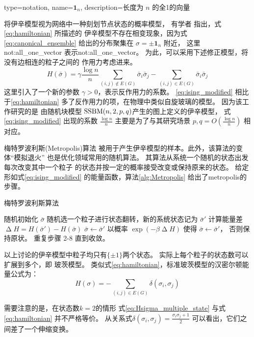 {
  type=notation,
  name={\ensuremath{\mathbf{1}_n}},
  description={长度为 $n$ 的全1的向量}
}

将伊辛模型视为网络中一种刻划节点状态的概率模型，
有学者\cite{ye2020exact}
指出，式\eqref{eq:hamiltonian} 所描述的
伊辛模型不存在相变现象，因为式\eqref{eq:canonical_ensemble}
给出的分布聚集在 $\sigma=\pm \mathbf{1}_n$ 附近，
这里 \gls{not:all_one_vector} 表示\glsdesc{not:all_one_vector}。
为此，可以采用下述修正模型，将没有边相连的粒子之间的
作用力考虑进来。
\begin{equation}\label{eq:ising_modified}
  H(\bar{\sigma}) = \gamma \frac{\log n}{n} \sum_{(i,j)\not\in E(G)}
  \bar{\sigma}_i  \bar{\sigma}_j
	- \sum_{(i,j)\in E(G)}
  \bar{\sigma}_i  \bar{\sigma}_j
\end{equation}
这里引入了一个新的参数 $\gamma > 0$，表示反作用力的系数。
\eqref{eq:ising_modified}
相比于\eqref{eq:hamiltonian}
多了反作用力的项，在物理中类似自旋玻璃的模型\cite{lenka2016physics}。
因为该工作研究的是
由随机块模型 $\operatorname{SSBM}(n,2,p,q)$产生的图上定义的伊辛模型，
式\eqref{eq:ising_modified} 出现的系数
$\frac{\log n}{n}$
主要是为了与其研究场景 $p,q=O\left(\frac{\log n}{n} \right)$
相对应。


梅特罗波利斯(Metropolis)算法\cite{metropolis1953equation}
被用于产生伊辛模型的样本。此外，该算法的变体“模拟退火”
\cite{pincus1970monte} 也是优化领域常用的随机算法。
其算法从系统一个随机的状态出发每次改变其中一个粒子
的状态并按一定的概率接受改变或保持原来的状态。
给定形如式\eqref{eq:ising_modified}
的能量函数，算法\ref{alg:Metropolis}
给出了\gls{metropolis}的步骤。

\begin{algorithm}
  \caption{梅特罗波利斯算法}\label{alg:Metropolis}
  \begin{algorithmic}[1]
    \STATE 随机初始化 $\bar{\sigma}$
    \STATE 随机选一个粒子进行状态翻转，新的系统状态记为 $\bar{\sigma}'$ 
    \STATE 计算能量差 $\upDelta H= H(\bar{\sigma}') - H(\bar{\sigma})$
    \STATE $\bar{\sigma} \leftarrow \bar{\sigma}'$
    \ELSE
    \STATE 以概率 $\exp(-\beta \upDelta H)$ 
    使得 $\bar{\sigma} \leftarrow \bar{\sigma}'$，
    否则保持原状。 
    \ENDIF
    \STATE 重复步骤 2-8 直到收敛。
\end{algorithmic}  
\end{algorithm}

以上讨论的伊辛模型中粒子均只有$\{\pm 1\}$两个状态。
实际上每个粒子的状态数可以扩展到多个，即 玻茨模型\cite{potts1952some}。
类似式\eqref{eq:hamiltonian}，标准玻茨模型的汉密尔顿能量公式为：
\begin{equation}\label{eq:Hsigma_multiple_state}
  H(\sigma) = -\sum_{(i,j) \in E(G)}\delta(\sigma_i, \sigma_j)
\end{equation}
\begin{remark}\label{rem:equivalence_H_energy}
需要注意的是，在状态数$k=2$的情形
式\eqref{eq:Hsigma_multiple_state} 
与式\eqref{eq:hamiltonian}
并不严格等价。
从关系式$\delta(\sigma_i, \sigma_j) = \frac{\sigma_i \sigma_j + 1}{2}$
可以看出，它们之间差了一个伸缩变换。
\end{remark}


